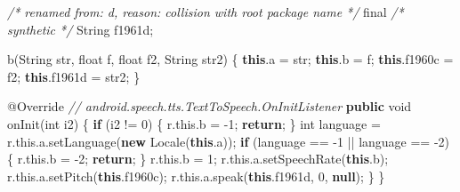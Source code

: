 \documentclass[
]{article}
\newenvironment{Shaded}{}{}
\newcommand{\AttributeTok}[1]{\textcolor[rgb]{0.49,0.56,0.16}{#1}}
\newcommand{\BuiltInTok}[1]{\textcolor[rgb]{0.00,0.50,0.00}{#1}}
\newcommand{\CommentTok}[1]{\textcolor[rgb]{0.38,0.63,0.69}{\textit{#1}}}
\newcommand{\ControlFlowTok}[1]{\textcolor[rgb]{0.00,0.44,0.13}{\textbf{#1}}}
\newcommand{\DataTypeTok}[1]{\textcolor[rgb]{0.56,0.13,0.00}{#1}}
\newcommand{\DecValTok}[1]{\textcolor[rgb]{0.25,0.63,0.44}{#1}}
\newcommand{\FunctionTok}[1]{\textcolor[rgb]{0.02,0.16,0.49}{#1}}
\newcommand{\KeywordTok}[1]{\textcolor[rgb]{0.00,0.44,0.13}{\textbf{#1}}}
\newcommand{\NormalTok}[1]{#1}
\newcommand{\OperatorTok}[1]{\textcolor[rgb]{0.40,0.40,0.40}{#1}}
\begin{document}
\begin{Shaded}
\begin{Highlighting}[]
        \CommentTok{/* renamed from: d, reason: collision with root package name */}
        \DataTypeTok{final} \CommentTok{/* synthetic */} \BuiltInTok{String}\NormalTok{ f1961d}\OperatorTok{;}

        \FunctionTok{b}\OperatorTok{(}\BuiltInTok{String}\NormalTok{ str}\OperatorTok{,} \DataTypeTok{float}\NormalTok{ f}\OperatorTok{,} \DataTypeTok{float}\NormalTok{ f2}\OperatorTok{,} \BuiltInTok{String}\NormalTok{ str2}\OperatorTok{)} \OperatorTok{\{}
            \KeywordTok{this}\OperatorTok{.}\FunctionTok{a} \OperatorTok{=}\NormalTok{ str}\OperatorTok{;}
            \KeywordTok{this}\OperatorTok{.}\FunctionTok{b} \OperatorTok{=}\NormalTok{ f}\OperatorTok{;}
            \KeywordTok{this}\OperatorTok{.}\FunctionTok{f1960c} \OperatorTok{=}\NormalTok{ f2}\OperatorTok{;}
            \KeywordTok{this}\OperatorTok{.}\FunctionTok{f1961d} \OperatorTok{=}\NormalTok{ str2}\OperatorTok{;}
        \OperatorTok{\}}

        \AttributeTok{@Override} \CommentTok{// android.speech.tts.TextToSpeech.OnInitListener}
        \KeywordTok{public} \DataTypeTok{void} \FunctionTok{onInit}\OperatorTok{(}\DataTypeTok{int}\NormalTok{ i2}\OperatorTok{)} \OperatorTok{\{}
            \ControlFlowTok{if} \OperatorTok{(}\NormalTok{i2 }\OperatorTok{!=} \DecValTok{0}\OperatorTok{)} \OperatorTok{\{}
\NormalTok{                r}\OperatorTok{.}\FunctionTok{this}\OperatorTok{.}\FunctionTok{b} \OperatorTok{=} \OperatorTok{{-}}\DecValTok{1}\OperatorTok{;}
                \ControlFlowTok{return}\OperatorTok{;}
            \OperatorTok{\}}
            \DataTypeTok{int}\NormalTok{ language }\OperatorTok{=}\NormalTok{ r}\OperatorTok{.}\FunctionTok{this}\OperatorTok{.}\FunctionTok{a}\OperatorTok{.}\FunctionTok{setLanguage}\OperatorTok{(}\KeywordTok{new} \BuiltInTok{Locale}\OperatorTok{(}\KeywordTok{this}\OperatorTok{.}\FunctionTok{a}\OperatorTok{));}
            \ControlFlowTok{if} \OperatorTok{(}\NormalTok{language }\OperatorTok{==} \OperatorTok{{-}}\DecValTok{1} \OperatorTok{||}\NormalTok{ language }\OperatorTok{==} \OperatorTok{{-}}\DecValTok{2}\OperatorTok{)} \OperatorTok{\{}
\NormalTok{                r}\OperatorTok{.}\FunctionTok{this}\OperatorTok{.}\FunctionTok{b} \OperatorTok{=} \OperatorTok{{-}}\DecValTok{2}\OperatorTok{;}
                \ControlFlowTok{return}\OperatorTok{;}
            \OperatorTok{\}}
\NormalTok{            r}\OperatorTok{.}\FunctionTok{this}\OperatorTok{.}\FunctionTok{b} \OperatorTok{=} \DecValTok{1}\OperatorTok{;}
\NormalTok{            r}\OperatorTok{.}\FunctionTok{this}\OperatorTok{.}\FunctionTok{a}\OperatorTok{.}\FunctionTok{setSpeechRate}\OperatorTok{(}\KeywordTok{this}\OperatorTok{.}\FunctionTok{b}\OperatorTok{);}
\NormalTok{            r}\OperatorTok{.}\FunctionTok{this}\OperatorTok{.}\FunctionTok{a}\OperatorTok{.}\FunctionTok{setPitch}\OperatorTok{(}\KeywordTok{this}\OperatorTok{.}\FunctionTok{f1960c}\OperatorTok{);}
\NormalTok{            r}\OperatorTok{.}\FunctionTok{this}\OperatorTok{.}\FunctionTok{a}\OperatorTok{.}\FunctionTok{speak}\OperatorTok{(}\KeywordTok{this}\OperatorTok{.}\FunctionTok{f1961d}\OperatorTok{,} \DecValTok{0}\OperatorTok{,} \KeywordTok{null}\OperatorTok{);}
        \OperatorTok{\}}
    \OperatorTok{\}}


\end{Highlighting}
\end{Shaded}
\end{document}
